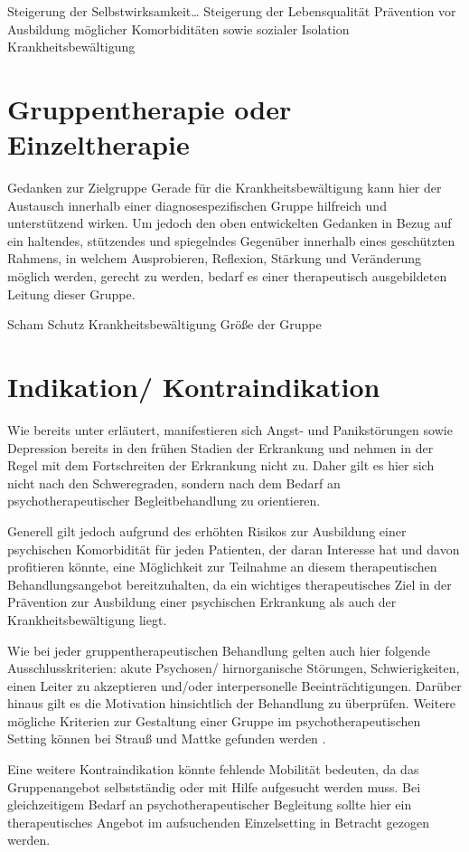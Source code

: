 Steigerung der Selbstwirksamkeit…
Steigerung der Lebensqualität
Prävention vor Ausbildung möglicher Komorbiditäten sowie sozialer Isolation
Krankheitsbewältigung

\section{Gruppentherapie oder Einzeltherapie}
Gedanken zur Zielgruppe
Gerade für die Krankheitsbewältigung kann hier der Austausch innerhalb einer diagnosespezifischen Gruppe hilfreich und unterstützend wirken. Um jedoch den oben entwickelten Gedanken in Bezug auf ein haltendes, stützendes und spiegelndes Gegenüber innerhalb eines geschützten Rahmens, in welchem Ausprobieren, Reflexion, Stärkung und Veränderung möglich werden, gerecht zu werden, bedarf es einer therapeutisch ausgebildeten Leitung dieser Gruppe. 

Scham
Schutz
Krankheitsbewältigung
Größe der Gruppe

\section{Indikation/ Kontraindikation}
Wie bereits unter \label{psychische_komorbiditaet} erläutert, manifestieren sich Angst- und Panikstörungen sowie Depression bereits in den frühen Stadien der Erkrankung und nehmen in der Regel mit dem Fortschreiten der Erkrankung nicht zu. Daher gilt es hier sich nicht nach den Schweregraden, sondern nach dem Bedarf an psychotherapeutischer Begleitbehandlung zu orientieren. 

Generell gilt jedoch aufgrund des erhöhten Risikos zur Ausbildung einer psychischen Komorbidität für jeden Patienten, der daran Interesse hat und davon profitieren könnte, eine Möglichkeit zur Teilnahme an diesem therapeutischen Behandlungsangebot bereitzuhalten, da ein wichtiges therapeutisches Ziel in der Prävention zur Ausbildung einer psychischen Erkrankung als auch der Krankheitsbewältigung liegt.

Wie bei jeder gruppentherapeutischen Behandlung gelten auch hier folgende Ausschlusskriterien: akute Psychosen/ hirnorganische Störungen, Schwierigkeiten, einen Leiter zu akzeptieren und/oder interpersonelle Beeinträchtigungen. Darüber hinaus gilt es die Motivation hinsichtlich der Behandlung zu überprüfen. Weitere mögliche Kriterien zur Gestaltung einer Gruppe im psychotherapeutischen Setting können bei Strauß und Mattke gefunden werden \autocite[vgl.][78-88]{mattke2007}.

Eine weitere Kontraindikation könnte fehlende Mobilität bedeuten, da das Gruppenangebot selbstständig oder mit Hilfe aufgesucht werden muss. Bei gleichzeitigem Bedarf an psychotherapeutischer Begleitung sollte hier ein therapeutisches Angebot im aufsuchenden Einzelsetting in Betracht gezogen werden.

